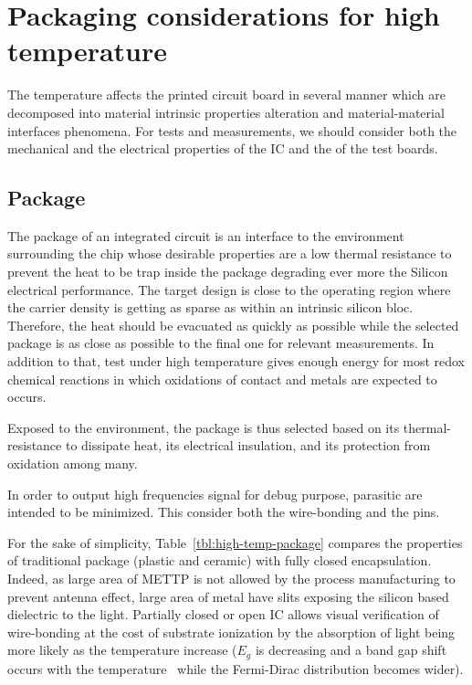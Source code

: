 
\chapter{Packaging considerations for high temperature}
\label{app:Packaging}

The temperature affects the printed circuit board in several manner which are decomposed into material intrinsic properties alteration and material-material interfaces phenomena. For tests and measurements, we should consider both the mechanical and the electrical properties of the IC and the of the test boards.

\section{Package}
The package of an integrated circuit is an interface to the environment surrounding the chip whose desirable properties are a low thermal resistance to prevent the heat to be trap inside the package degrading ever more the Silicon electrical performance. The target design is close to the operating region where the carrier density is getting as sparse as within an intrinsic silicon bloc.
Therefore, the heat should be evacuated as quickly as possible while the selected package is as close as possible to the final one for relevant measurements. In addition to that, test under high temperature gives enough energy for most redox chemical reactions in which oxidations of contact and metals are expected to occurs.

Exposed to the environment, the package is thus selected based on its thermal-resistance to dissipate heat, its electrical insulation, and its protection from oxidation among many.

In order to output high frequencies signal for debug purpose, parasitic are intended to be minimized. This consider both the wire-bonding and the pins.

For the sake of simplicity, Table~\ref{tbl:high-temp-package} compares the properties of traditional package (plastic and ceramic) with fully closed encapsulation. Indeed, as large area of METTP is not allowed by the process manufacturing to prevent antenna effect, large area of metal have slits exposing the silicon based dielectric to the light. Partially closed or open IC allows visual verification of wire-bonding at the cost of substrate ionization by the absorption of light being more likely as the temperature increase (\(E_g\) is decreasing and a band gap shift occurs with the temperature~\cite{Lautenschlager1985,Klenner1992} while the Fermi-Dirac distribution becomes wider).

